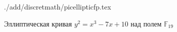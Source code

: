 \begin{figure}
\centering
 {./add/discretmath/picellipticfp.tex}
\caption{Эллиптическая кривая $y^2 = x^3 -7 x + 10$ над полем
  $\mathbb{F}_{19}$}
\label{fig:add:ellipticFp}
\end{figure}
